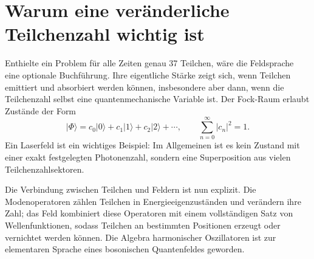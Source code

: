 \begin{classroomqa}
\end{classroomqa}

\begin{classroomqa}
\end{classroomqa}

\section{Warum eine veränderliche Teilchenzahl wichtig ist}

Enthielte ein Problem für alle Zeiten genau 37 Teilchen, wäre die Feldsprache eine optionale Buchführung. Ihre eigentliche Stärke zeigt sich, wenn Teilchen emittiert und absorbiert werden können, insbesondere aber dann, wenn die Teilchenzahl selbst eine quantenmechanische Variable ist. Der Fock-Raum erlaubt Zustände der Form
\begin{equation}
|\Phi\rangle
=c_0|0\rangle+c_1|1\rangle+c_2|2\rangle+\cdots,
\qquad
\sum_{n=0}^{\infty}|c_n|^2=1.
\end{equation}
Ein Laserfeld ist ein wichtiges Beispiel: Im Allgemeinen ist es kein Zustand mit einer exakt festgelegten Photonenzahl, sondern eine Superposition aus vielen Teilchenzahlsektoren.

Die Verbindung zwischen Teilchen und Feldern ist nun explizit. Die Modenoperatoren zählen Teilchen in Energieeigenzuständen und verändern ihre Zahl; das Feld kombiniert diese Operatoren mit einem vollständigen Satz von Wellenfunktionen, sodass Teilchen an bestimmten Positionen erzeugt oder vernichtet werden können. Die Algebra harmonischer Oszillatoren ist zur elementaren Sprache eines bosonischen Quantenfeldes geworden.